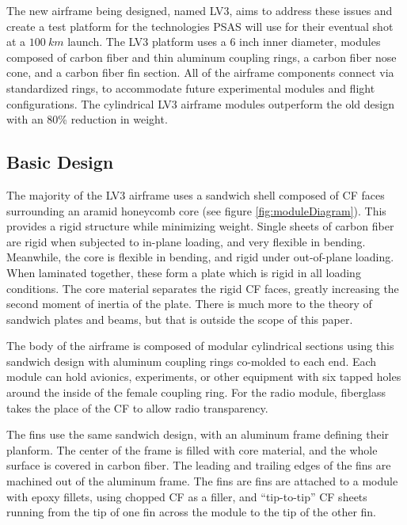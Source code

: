 \documentclass{aiaa-tc}%
\newcommand{\weightReduction}{80\%}
\begin{document}
The new airframe being designed, named LV3, aims to address these issues and create a test platform for the technologies PSAS will use for their eventual shot at a $\SI{100}{km}$ launch. The LV3 platform uses a 6 inch inner diameter, modules composed of carbon fiber and thin aluminum coupling rings, a carbon fiber nose cone, and a carbon fiber fin section. All of the airframe components connect via standardized rings, to accommodate future experimental modules and flight configurations.
The cylindrical LV3 airframe modules outperform the old design with an \weightReduction{} reduction in weight.

\pagebreak

\subsection{Basic Design}

The majority of the LV3 airframe uses a sandwich shell composed of CF faces surrounding an aramid honeycomb core (see figure \ref{fig:moduleDiagram}). This provides a rigid structure while minimizing weight. 
Single sheets of carbon fiber are rigid when subjected to in-plane loading, and very flexible in bending. Meanwhile, the core is flexible in bending, and rigid under out-of-plane loading. 
When laminated together, these form a plate which is rigid in all loading conditions. The core material separates the rigid CF faces, greatly increasing the second moment of inertia of the plate. 
There is much more to the theory of sandwich plates and beams, but that is outside the scope of this paper. 

The body of the airframe is composed of modular cylindrical sections using this sandwich design with aluminum coupling rings co-molded to each end.
Each module can hold avionics, experiments, or other equipment with six tapped holes around the inside of the female coupling ring. 
For the radio module, fiberglass takes the place of the CF to allow radio transparency.

The fins use the same sandwich design, with an aluminum frame defining their planform. The center of the frame is filled with core material, and the whole surface is covered in carbon fiber. 
The leading and trailing edges of the fins are machined out of the aluminum frame. 
The fins are fins are attached to a module with epoxy fillets, using chopped CF as a filler, and ``tip-to-tip'' CF sheets running from the tip of one fin across the module to the tip of the other fin.
\end{document}

